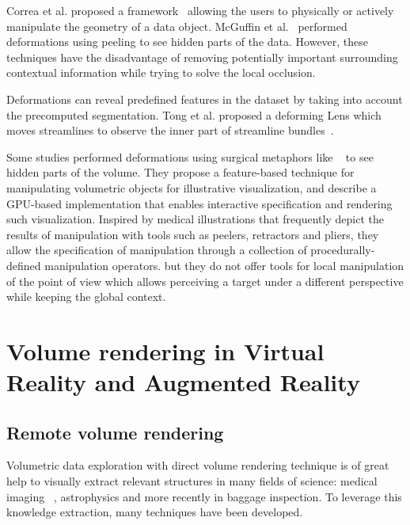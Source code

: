   Correa et al. proposed a framework~\cite{Correa:2007:IDD:1313046.1313163} allowing the users to physically or actively manipulate the geometry of a data object. McGuffin et al.~\cite{1250400} performed deformations using peeling to see hidden parts of the data. However, these techniques have the disadvantage of removing potentially important surrounding contextual information while trying to solve the local occlusion. 
 
 
Deformations can reveal predefined features in the dataset by taking into account the precomputed segmentation. Tong et al. proposed a deforming Lens which moves streamlines to observe the inner part of streamline bundles~\cite{7332955}. 

Some studies performed deformations using surgical metaphors like ~\cite{4069230,Correa:2006:FAV:1187627.1187827} to see hidden parts of the volume.
They propose a feature-based technique for manipulating volumetric objects for illustrative visualization, and describe a GPU-based implementation that enables interactive specification and rendering
such visualization. Inspired by medical illustrations that frequently depict the results of manipulation with tools such as peelers, retractors and pliers, they allow the specification of manipulation
through a collection of procedurally-defined manipulation operators.
  but they do not offer tools for local manipulation of the point of view which allows perceiving a target under a different perspective while keeping the global context. 


\section{Volume rendering in Virtual Reality and Augmented Reality}

\subsection{ Remote volume rendering}

Volumetric data exploration with direct volume rendering technique is of great help to visually extract relevant structures in many fields of science: medical imaging ~\cite{ljung_full_2006}, astrophysics and more recently in baggage inspection. To leverage this knowledge extraction, many techniques have been developed. 

